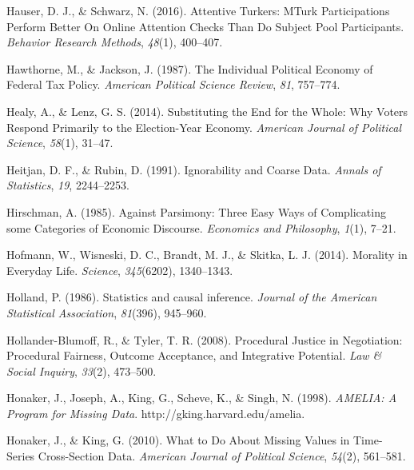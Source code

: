 \documentclass[12pt,econ]{sources/authesis}
\begin{document}
\leavevmode\hypertarget{ref-hauser_attentive_2016}{}%
Hauser, D. J., \& Schwarz, N. (2016). Attentive Turkers: MTurk Participations Perform Better On Online Attention Checks Than Do Subject Pool Participants. \emph{Behavior Research Methods}, \emph{48}(1), 400--407.

\leavevmode\hypertarget{ref-hawthorne_individual_1987}{}%
Hawthorne, M., \& Jackson, J. (1987). The Individual Political Economy of Federal Tax Policy. \emph{American Political Science Review}, \emph{81}, 757--774.

\leavevmode\hypertarget{ref-healy_2014_substituting}{}%
Healy, A., \& Lenz, G. S. (2014). Substituting the End for the Whole: Why Voters Respond Primarily to the Election-Year Economy. \emph{American Journal of Political Science}, \emph{58}(1), 31--47.

\leavevmode\hypertarget{ref-heitjan_1991_ignorability}{}%
Heitjan, D. F., \& Rubin, D. (1991). Ignorability and Coarse Data. \emph{Annals of Statistics}, \emph{19}, 2244--2253.

\leavevmode\hypertarget{ref-hirschman_against_1985}{}%
Hirschman, A. (1985). Against Parsimony: Three Easy Ways of Complicating some Categories of Economic Discourse. \emph{Economics and Philosophy}, \emph{1}(1), 7--21.

\leavevmode\hypertarget{ref-hofmann_2014_morality}{}%
Hofmann, W., Wisneski, D. C., Brandt, M. J., \& Skitka, L. J. (2014). Morality in Everyday Life. \emph{Science}, \emph{345}(6202), 1340--1343.

\leavevmode\hypertarget{ref-holland_1986_statistics}{}%
Holland, P. (1986). Statistics and causal inference. \emph{Journal of the American Statistical Association}, \emph{81}(396), 945--960.

\leavevmode\hypertarget{ref-hollander-blumoff_2008_procedural}{}%
Hollander-Blumoff, R., \& Tyler, T. R. (2008). Procedural Justice in Negotiation: Procedural Fairness, Outcome Acceptance, and Integrative Potential. \emph{Law \& Social Inquiry}, \emph{33}(2), 473--500.

\leavevmode\hypertarget{ref-honaker_1998_amelia}{}%
Honaker, J., Joseph, A., King, G., Scheve, K., \& Singh, N. (1998). \emph{AMELIA: A Program for Missing Data}. http://gking.harvard.edu/amelia.

\leavevmode\hypertarget{ref-honaker_2010_what}{}%
Honaker, J., \& King, G. (2010). What to Do About Missing Values in Time-Series Cross-Section Data. \emph{American Journal of Political Science}, \emph{54}(2), 561--581.
\end{document}
